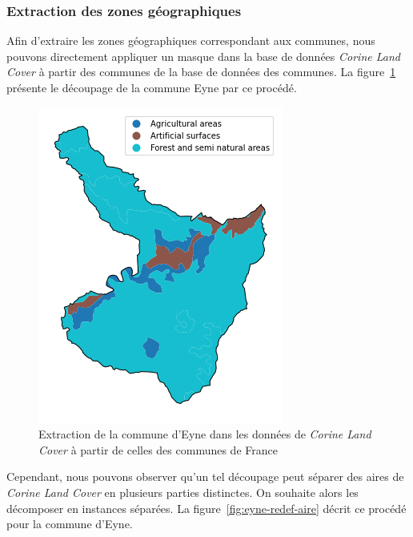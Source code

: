 \subsubsection{Extraction des zones géographiques}

Afin d'extraire les zones géographiques correspondant aux communes, nous pouvons directement appliquer un masque dans la base de données \emph{Corine Land Cover} à partir des communes de la base de données des communes.
La figure~\ref{fig:eyne-decoupe-brute} présente le découpage de la commune Eyne par ce procédé.

\begin{figure}[!h]
    \centering
    \includegraphics[scale=0.5]{figures/eyne-decoupe-brute}
    \caption{Extraction de la commune d'Eyne dans les données de \emph{Corine Land Cover} à partir de celles des communes de France}
    \label{fig:eyne-decoupe-brute}
\end{figure}

Cependant, nous pouvons observer qu'un tel découpage peut séparer des aires de \emph{Corine Land Cover} en plusieurs parties distinctes.
On souhaite alors les décomposer en instances séparées.
La figure~\ref{fig:eyne-redef-aire} décrit ce procédé pour la commune d'Eyne.

